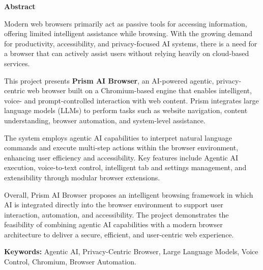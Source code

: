 \thispagestyle{frontmatter}

\begin{center}
    {\Large \textbf{Abstract}}
\end{center}

\vspace{0.6cm}

\hspace{0.5cm} Modern web browsers primarily act as passive tools for accessing information, offering
limited intelligent assistance while browsing. With the growing demand for productivity,
accessibility, and privacy-focused AI systems, there is a need for a browser that can actively
assist users without relying heavily on cloud-based services.

This project presents \textbf{Prism AI Browser}, an AI-powered agentic, privacy-centric
web browser built on a Chromium-based engine that enables intelligent, voice- and
prompt-controlled interaction with web content. Prism integrates large language models
(LLMs) to perform tasks such as website navigation, content understanding, browser
automation, and system-level assistance.

The system employs agentic AI capabilities to interpret natural language commands and
execute multi-step actions within the browser environment, enhancing user efficiency and
accessibility. Key features include Agentic AI execution, voice-to-text control, intelligent
tab and settings management, and extensibility through modular browser extensions.

Overall, Prism AI Browser proposes an intelligent browsing framework in which AI is
integrated directly into the browser environment to support user interaction, automation,
and accessibility. The project demonstrates the feasibility of combining agentic AI
capabilities with a modern browser architecture to deliver a secure, efficient, and
user-centric web experience.

\vspace{0.6cm}
\noindent \textbf{Keywords:} Agentic AI, Privacy-Centric Browser, Large Language Models,
Voice Control, Chromium, Browser Automation.
